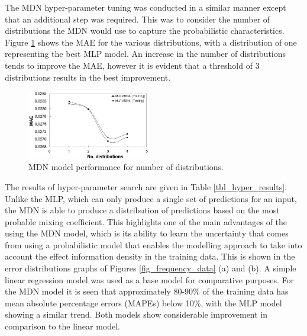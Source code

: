 \documentclass[a4paper,fleqn]{cas-sc}
\begin{document}
The MDN hyper-parameter tuning was conducted in a similar manner except that an additional step was required. This was to consider the number of distributions the MDN would use to capture the probabilistic characteristics. Figure \ref{fig_mdn_hyper} shows the MAE for the various distributions, with a distribution of one representing the best MLP model. An increase in the number of distributions tends to improve the MAE, however it is evident that a threshold of 3 distributions results in the best improvement.
\newpage
\begin{figure}[h!]
	\centering
		\includegraphics[width=0.48\textwidth]{DIST_HYPER}
	  \caption{MDN model performance for number of distributions.}\label{fig_mdn_hyper}
\end{figure}

The results of hyper-parameter search are given in Table \ref{tbl_hyper_results}. Unlike the MLP, which can only produce a single set of predictions for an input, the MDN is able to produce a distribution of predictions based on the most probable mixing coefficient. This highlights one of the main advantages of the using the MDN model, which is its ability to learn the uncertainty that comes from using a probabilistic model that enables the modelling approach to take into account the effect information density in the training data. This is shown in the error distributions graphs of Figures \ref{fig_frequency_data} (a) and (b). A simple linear regression model was used as a base model for comparative purposes. For the MDN model it is seen that approximately 80-90\% of the training data has mean absolute percentage errors (MAPEs) below 10\%, with the MLP model showing a similar trend. Both models show considerable improvement in comparison to the linear model.\\
\end{document}

